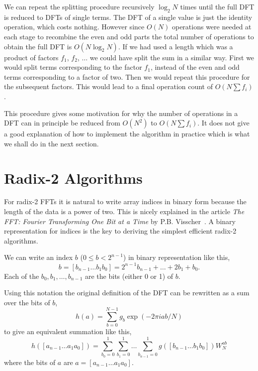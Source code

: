 \documentclass[fleqn,12pt]{article}
\begin{document}
We can repeat the splitting procedure recursively $\log_2 N$ times
until the full DFT is reduced to DFTs of single terms. The DFT of a
single value is just the identity operation, which costs nothing.
However since $O(N)$ operations were needed at each stage to recombine
the even and odd parts the total number of operations to obtain the
full DFT is $O(N \log_2 N)$. If we had used a length which was a
product of factors $f_1$, $f_2$, $\dots$ we could have split the sum
in a similar way. First we would split terms corresponding to the
factor $f_1$, instead of the even and odd terms corresponding to a
factor of two.  Then we would repeat this procedure for the subsequent
factors. This would lead to a final operation count of $O(N \sum
f_i)$.

This procedure gives some motivation for why the number of operations
in a DFT can in principle be reduced from $O(N^2)$ to $O(N \sum f_i)$.
It does not give a good explanation of how to implement the algorithm
in practice which is what we shall do in the next section.

\section{Radix-2 Algorithms}
%
For radix-2 FFTs it is natural to write array indices in binary form
because the length of the data is a power of two. This is nicely
explained in the article {\em The FFT: Fourier Transforming One Bit at
a Time} by P.B. Visscher~\cite{visscher96}. A binary representation
for indices is the key to deriving the simplest efficient radix-2
algorithms.

We can write an index $b$ ($0 \leq b < 2^{n-1}$) in binary
representation like this,
%
\begin{equation}
b = [b_{n-1} \dots b_1 b_0] = 2^{n-1}b_{n-1} + \dots + 2 b_1 + b_0 .
\end{equation}
%
Each of the $b_0, b_1, \dots, b_{n-1}$ are the bits (either 0 or 1) of
$b$.

Using this notation the original definition of the DFT
can be rewritten as a sum over the bits of $b$,
%
\begin{equation} 
h(a) = \sum_{b=0}^{N-1} g_b \exp(-2\pi i a b /N)
\end{equation}
%
to give an equivalent summation like this,
%
\begin{equation} 
h([a_{n-1} \dots a_1 a_0]) = 
\sum_{b_0=0}^{1} 
\sum_{b_1=0}^{1} 
\dots
\sum_{b_{n-1}=0}^{1} 
 g([b_{n-1} \dots b_1 b_0]) W_N^{ab}
\end{equation}
%
where the bits of $a$ are $a=[a_{n-1} \dots a_1 a_0]$. 
\end{document}
